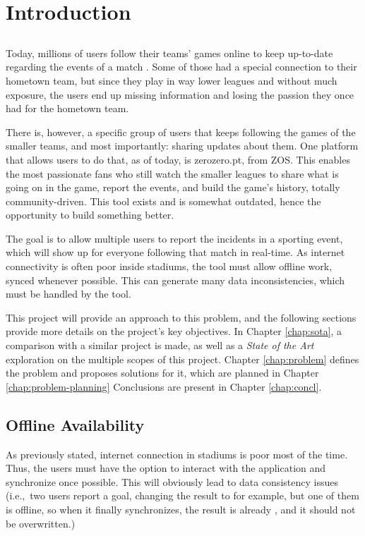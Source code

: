 \chapter{Introduction} \label{chap:intro}

\section*{}

Today, millions of users follow their teams' games online to keep up-to-date regarding the events of a match \cite{facebook-livestream-stats}. Some of those had a special connection to their hometown team, but since they play in way lower leagues and without much exposure, the users end up missing information and losing the passion they once had for the hometown team.

There is, however,  a specific group of users that keeps following the games of the smaller teams, and most importantly: sharing updates about them. One platform that allows users to do that, as of today, is zerozero.pt, from ZOS. This enables the most passionate fans who still watch the smaller leagues to share what is going on in the game, report the events, and build the game's history, totally community-driven. This tool exists and is somewhat outdated, hence the opportunity to build something better.

The goal is to allow multiple users to report the incidents in a sporting event, which will show up for everyone following that match in real-time. As internet connectivity is often poor inside stadiums, the tool must allow offline work, synced whenever possible. This can generate many data inconsistencies, which must be handled by the tool.

This project will provide an approach to this problem, and the following sections provide more details on the project's key objectives. In Chapter \ref{chap:sota}, a comparison with a similar project is made, as well as a \textit{State of the Art} exploration on the multiple scopes of this project. Chapter \ref{chap:problem} defines the problem and proposes solutions for it, which are planned in Chapter \ref{chap:problem-planning} Conclusions are present in Chapter \ref{chap:concl}. 

\section{Offline Availability} \label{sec:offline-avail-intro}

As previously stated, internet connection in stadiums is poor most of the time. Thus, the users must have the option to interact with the application and synchronize once possible. This will obviously lead to data consistency issues (i.e.,\ two users report a goal, changing the result to  for example, but one of them is offline, so when it finally synchronizes, the result is already , and it should not be overwritten.)

